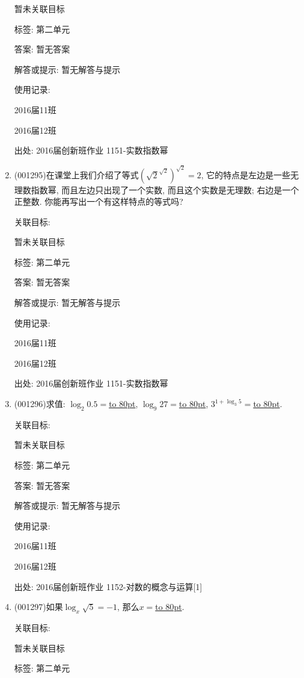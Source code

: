 \documentclass[10pt,a4paper]{article}
\newcommand{\blank}[1]{\underline{\hbox to #1pt{}}}
\begin{document}
\begin{enumerate}[1.]
暂未关联目标



标签: 第二单元

答案: 暂无答案

解答或提示: 暂无解答与提示

使用记录:

2016届11班	

2016届12班	


出处: 2016届创新班作业	1151-实数指数幂
\item { (001295)}在课堂上我们介绍了等式$\left(\sqrt{2}^{\sqrt{2}}\right)^{\sqrt{2}}=2$, 它的特点是左边是一些无理数指数幂, 而且左边只出现了一个实数, 而且这个实数是无理数; 右边是一个正整数. 你能再写出一个有这样特点的等式吗?


关联目标:

暂未关联目标



标签: 第二单元

答案: 暂无答案

解答或提示: 暂无解答与提示

使用记录:

2016届11班	

2016届12班	


出处: 2016届创新班作业	1151-实数指数幂
\item { (001296)}求值: $\log_2 0.5=$\blank{80}, $\log_9 27=$\blank{80}, $3^{1+\log_3 5}=$\blank{80}.


关联目标:

暂未关联目标



标签: 第二单元

答案: 暂无答案

解答或提示: 暂无解答与提示

使用记录:

2016届11班	

2016届12班	


出处: 2016届创新班作业	1152-对数的概念与运算[1]
\item { (001297)}如果$\log_x\sqrt{5}=-1$, 那么$x=$\blank{80}.


关联目标:

暂未关联目标



标签: 第二单元


\end{enumerate}
\end{document}
